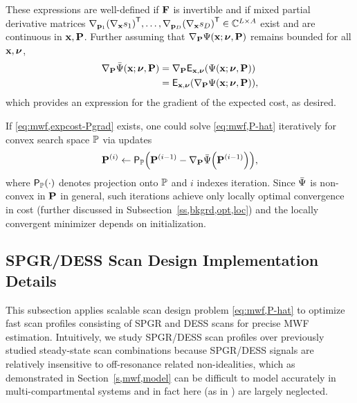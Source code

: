 These expressions are well-defined 
if $\mathbf{F}$ is invertible 
and if mixed partial derivative matrices
$\grada{\bmp_1}{\paren{\grada{\bmx}{s_1}}\tpose},
\dots,
\grada{\bmp_D}{\paren{\grada{\bmx}{s_D}}\tpose}
\in \complexes{L \times A}$
exist and are continuous in $\mathbf{x},\mathbf{P}$. 
Further assuming 
that $\grada{\bmP}{\costa{\bmx; \bmnu, \bmP}}$ remains bounded 
for all $\mathbf{x},\boldsymbol{\nu}$, 
\begin{align}
	\grada{\bmP}{\expcost\paren{\bmx; \bmnu, \bmP}} 
		&= 
		\grada{\bmP}{\expect{\bmx,\bmnu}{\costa{\bmx; \bmnu, \bmP}}}
		\nonumber \\
		&= 
		\expect{\bmx,\bmnu}{\grada{\bmP}{\costa{\bmx; \bmnu, \bmP}}},
		\label{eq:mwf,expcost-Pgrad}
\end{align} 
which provides an expression
for the gradient of the expected cost,
as desired.

If \eqref{eq:mwf,expcost-Pgrad} exists,
one could solve \eqref{eq:mwf,P-hat} iteratively
for convex search space $\mathbb{P}$
via updates
\begin{align}
	\iter{\bmP}{i} \gets 
		\proja{\setP}{\iter{\bmP}{i-1}-\grada{\bmP}{\expcost\paren{\iter{\bmP}{i-1}}}},
		\label{eq:mwf,P-iter}
\end{align}
where $\proja{\setP}{\cdot}$ denotes projection onto $\mathbb{P}$
and $i$ indexes iteration.
Since $\bar{\Psi}$ is non-convex in $\mathbf{P}$ in general,
such iterations achieve
only locally optimal convergence in cost
(further discussed in Subsection~\ref{ss,bkgrd,opt,loc})
and the locally convergent minimizer
depends on initialization.

\subsection{SPGR/DESS Scan Design Implementation Details}
\label{ss,mwf,acq,detail}

This subsection applies 
scalable scan design problem \eqref{eq:mwf,P-hat}
to optimize fast scan profiles 
consisting of SPGR and DESS scans
for precise MWF estimation.
Intuitively,
we study SPGR/DESS scan profiles
over previously studied steady-state scan combinations
\cite{deoni:08:gmt, deoni:11:com, deoni:13:oct}
because SPGR/DESS signals
are relatively insensitive
to off-resonance related non-idealities,
which as demonstrated 
in Section~\ref{s,mwf,model}
can be difficult
to model accurately 
in multi-compartmental systems
and in fact here 
(as in \cite{deoni:11:com, deoni:13:oct})
are largely neglected.

